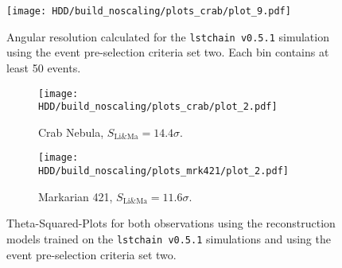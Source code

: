 \begin{figure}
    \centering
    \texttt{[image: HDD/build\_noscaling/plots\_crab/plot\_9.pdf]}
    \caption{Angular resolution calculated for the \texttt{lstchain v0.5.1} simulation using the event pre-selection criteria set two.
        Each bin contains at least 50 events.
    }
    \label{fig:ang_res_oldMC_150}
\end{figure}

\begin{figure}
    \centering
    \begin{subfigure}{0.49\textwidth}
        \centering
        \texttt{[image: HDD/build\_noscaling/plots\_crab/plot\_2.pdf]}
        \caption{Crab Nebula, $S_\text{Li\&Ma} = \num{14.4} \sigma$.}
        \label{fig:crab_oldMC_150}
    \end{subfigure}
    \hfill
    \begin{subfigure}{0.49\textwidth}
        \centering
        \texttt{[image: HDD/build\_noscaling/plots\_mrk421/plot\_2.pdf]}
        \caption{Markarian 421, $S_\text{Li\&Ma} = \num{11.6} \sigma$.}
        \label{fig:mrk_oldMC_150}
    \end{subfigure}
    \caption{Theta-Squared-Plots for both observations using the reconstruction models trained on the \texttt{lstchain v0.5.1} simulations and using 
        the event pre-selection criteria set two.
    }
    \label{fig:obs_oldMC_150}
\end{figure}


